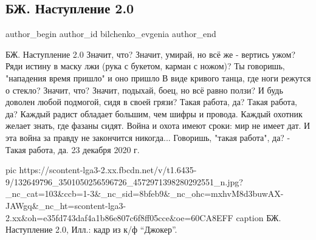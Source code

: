  
 
 
 
 
 
\subsection{БЖ. Наступление 2.0}
\label{sec:23_12_2020.fb.bilchenko_evgenia.1.nastuplenie_2_0}
\ifcmt
 author_begin
   author_id bilchenko_evgenia
 author_end
\fi

БЖ. Наступление 2.0
Значит, что? Значит, умирай, но всё же - вертись ужом?
Ряди истину в маску лжи (рука с букетом, карман с ножом)?
Ты говоришь, "нападения время пришло" и оно пришло
В виде кривого танца, где ноги режутся о стекло?
Значит, что? Значит, подыхай, боец, но всё равно ползи?
И будь доволен любой подмогой, сидя в своей грязи?
Такая работа, да? Такая работа, да?
Каждый радист обладает большим, чем шифры и провода.
Каждый охотник желает знать, где фазаны сидят.
Война и охота имеют сроки: мир не имеет дат.
И эта война за правду не закончится никогда...
Говоришь, "такая работа", да? 
- Такая работа, да.
23 декабря 2020 г.

\ifcmt
  pic https://scontent-lga3-2.xx.fbcdn.net/v/t1.6435-9/132649796_3501050256596726_4572971398280292551_n.jpg?_nc_cat=103&ccb=1-3&_nc_sid=8bfeb9&_nc_ohc=mxhvM8d3buwAX-JAWgq&_nc_ht=scontent-lga3-2.xx&oh=e35fd743daf4a1b86e807c6f8ff05cce&oe=60CA8EFF
	caption БЖ. Наступление 2.0, Илл.: кадр из к/ф \enquote{Джокер}.
\fi

